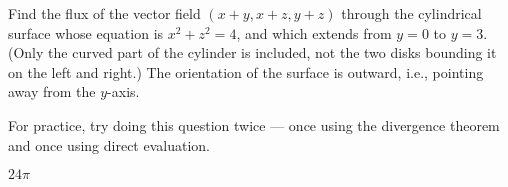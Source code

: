 \begin{question}[M317 2008D] %
Find the flux of the vector field $(x + y, x + z, y + z)$ 
through the cylindrical surface whose equation is $x^2 + z^2 = 4$, 
and which extends from $y = 0$ to $y = 3$. (Only the curved part 
of the cylinder is included, not the two disks bounding it on the 
left and right.) The orientation of the surface is outward, 
i.e., pointing away from the $y$-axis.
\end{question}

\begin{hint} 
For practice, try doing this question twice --- once using the divergence
theorem and once using direct evaluation.
\end{hint}

\begin{answer} 
$24\pi$
\end{answer}

